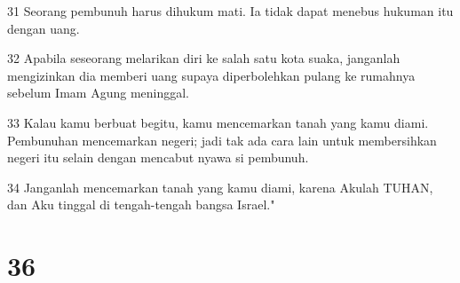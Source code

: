 \par 31 Seorang pembunuh harus dihukum mati. Ia tidak dapat menebus hukuman itu dengan uang.
\par 32 Apabila seseorang melarikan diri ke salah satu kota suaka, janganlah mengizinkan dia memberi uang supaya diperbolehkan pulang ke rumahnya sebelum Imam Agung meninggal.
\par 33 Kalau kamu berbuat begitu, kamu mencemarkan tanah yang kamu diami. Pembunuhan mencemarkan negeri; jadi tak ada cara lain untuk membersihkan negeri itu selain dengan mencabut nyawa si pembunuh.
\par 34 Janganlah mencemarkan tanah yang kamu diami, karena Akulah TUHAN, dan Aku tinggal di tengah-tengah bangsa Israel."

\chapter{36}

